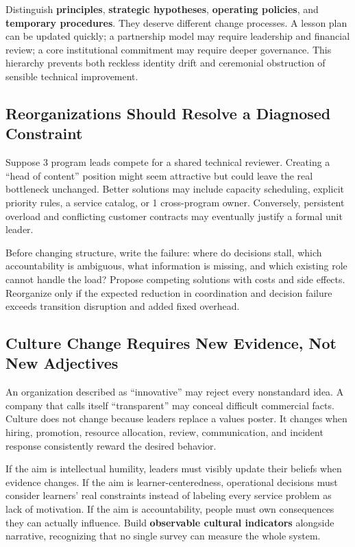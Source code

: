 Distinguish \textbf{principles}, \textbf{strategic hypotheses}, \textbf{operating policies}, and \textbf{temporary procedures}. They deserve different change processes. A lesson plan can be updated quickly; a partnership model may require leadership and financial review; a core institutional commitment may require deeper governance. This hierarchy prevents both reckless identity drift and ceremonial obstruction of sensible technical improvement.

\subsection{Reorganizations Should Resolve a Diagnosed Constraint}
\label{sec:reorgs_resolve_diagnosed_constraint}

Suppose 3 program leads compete for a shared technical reviewer. Creating a ``head of content'' position might seem attractive but could leave the real bottleneck unchanged. Better solutions may include capacity scheduling, explicit priority rules, a service catalog, or 1 cross-program owner. Conversely, persistent overload and conflicting customer contracts may eventually justify a formal unit leader.

Before changing structure, write the failure: where do decisions stall, which accountability is ambiguous, what information is missing, and which existing role cannot handle the load? Propose competing solutions with costs and side effects. Reorganize only if the expected reduction in coordination and decision failure exceeds transition disruption and added fixed overhead.

\subsection{Culture Change Requires New Evidence, Not New Adjectives}
\label{sec:culture_change_new_evidence}

An organization described as ``innovative'' may reject every nonstandard idea. A company that calls itself ``transparent'' may conceal difficult commercial facts. Culture does not change because leaders replace a values poster. It changes when hiring, promotion, resource allocation, review, communication, and incident response consistently reward the desired behavior.

If the aim is intellectual humility, leaders must visibly update their beliefs when evidence changes. If the aim is learner-centeredness, operational decisions must consider learners' real constraints instead of labeling every service problem as lack of motivation. If the aim is accountability, people must own consequences they can actually influence. Build \textbf{observable cultural indicators} alongside narrative, recognizing that no single survey can measure the whole system.

